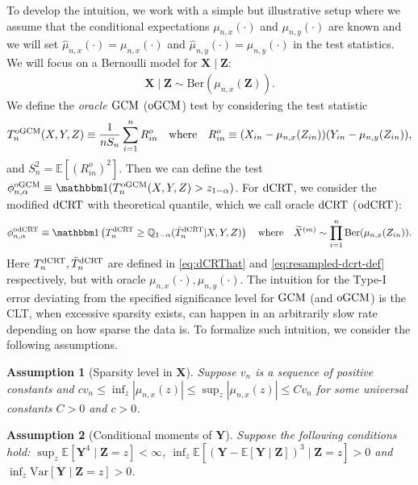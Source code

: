 \documentclass[12pt]{article}
\newtheorem{assumption}{Assumption}
\theoremstyle{definition}
\newcommand{\E}{\mathbb E}								%
\newcommand{\Q}{\mathbb{Q}}								%
\newcommand{\indicator}{\mathbbm 1}						%
\newcommand{\prx}{\bm X}								%
\newcommand{\srx}{X}									%
\newcommand{\prz}{\bm Z}								%
\newcommand{\srz}{Z}									%
\newcommand{\pry}{{\bm Y}}								%
\newcommand{\sry}{Y}									%
\newcommand{\dCRT}{\textnormal{dCRT}} 					%
\newcommand{\odCRT}{\textnormal{odCRT}} 					%
\newcommand{\GCM}{\textnormal{GCM}}						%
\newcommand{\oGCM}{\textnormal{oGCM}}						%
\begin{document}
To develop the intuition, we work with a simple but illustrative setup where we assume that the conditional expectations $\mu_{n,x}(\cdot)$ and $\mu_{n,y}(\cdot)$ are known and we will set $\widehat{\mu}_{n,x}(\cdot) = \mu_{n,x}(\cdot)$ and $\widehat{\mu}_{n,y}(\cdot) = \mu_{n,y}(\cdot)$ in the test statistics. We will focus on a Bernoulli model for $\prx\mid \prz$:
\begin{align}\label{eq:illustrative_bernoulli}
  \prx\mid \prz\sim \mathrm{Ber}(\mu_{n,x}(\prz)).
\end{align}
We define the \textit{oracle $\GCM$} ($\oGCM$) test by considering the test statistic 
\small
\begin{align}\label{eq:oGCM}
  T_{n}^{\oGCM}(\srx,\sry,\srz)\equiv\frac{1}{nS_n}\sum_{i=1}^{n}R_{in}^o\quad\text{where}\quad R_{in}^o\equiv(\srx_{in}-\mu_{n,x}(\srz_{in}))(\sry_{in}-\mu_{n,y}(\srz_{in})),
\end{align}
\normalsize
and $S_n^2=\E[(R_{in}^o)^2]$. Then we can define the test $\phi_{n,\alpha}^{\oGCM}\equiv \indicator(T_n^{\oGCM}(\srx,\sry,\srz)>z_{1-\alpha})$. For $\dCRT$, we consider the modified $\dCRT$ with theoretical quantile, which we call oracle $\dCRT$ ($\odCRT$):
\begin{align*}
  \phi^{\odCRT}_{n,\alpha}\equiv \indicator\left(T_n^{\dCRT}\geq \Q_{1-\alpha}(\tilde T_{n}^{\dCRT}|\srx,\sry,\srz)\right)\quad\text{where}\quad \widetilde{X}^{(m)}\sim \prod_{i=1}^n \mathrm{Ber}(\mu_{n,x}(\srz_{in})).
\end{align*}
Here $T_n^{\dCRT},\tilde T_{n}^{\dCRT}$ are defined in \eqref{eq:dCRThat} and \eqref{eq:resampled-dcrt-def} respectively, but with oracle $\mu_{n,x}(\cdot),\mu_{n,y}(\cdot)$. The intuition for the Type-I error deviating from the specified significance level for $\GCM$ (and $\oGCM$) is the CLT, when excessive sparsity exists, can happen in an arbitrarily slow rate depending on how sparse the data is. To formalize such intuition, we consider the following assumptions.
\begin{assumption}[Sparsity level in $\prx$]\label{assu:sparsity}
  Suppose $v_n$ is a sequence of positive constants and $cv_n\leq\inf_{z}|\mu_{n,x}(z)|\leq \sup_{z}|\mu_{n,x}(z)|\leq Cv_n$ for some universal constants $C>0$ and $c>0$. 
\end{assumption}
\begin{assumption}[Conditional moments of $\pry$]\label{assu:finite-y-on-z-variance}
	Suppose the following conditions hold: $\sup_z\E[\pry^4\mid \prz=z]<\infty$, $\inf_z\E[(\pry - \E[\pry\mid \prz])^3\mid \prz=z]>0$ and $\inf_z\mathrm{Var}[\pry\mid \prz=z]>0$.
\end{assumption}
\end{document}
